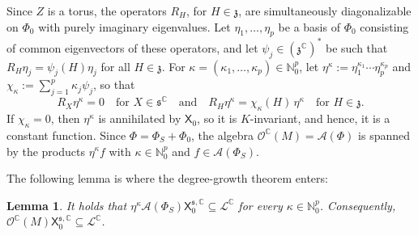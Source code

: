 \documentclass{article}
\newcommand{\N}{\mathbb{N}}
\newcommand{\C}{\mathbb{C}}
\newcommand{\fraks}{\mathfrak{s}}
\newcommand{\frakz}{\mathfrak{z}}
\newcommand{\sX}{\mathsf{X}}
\newcommand{\Ocal}{\mathcal{O}}
\newcommand{\cL}{\mathcal{L}}
\newtheorem{lemma}{Lemma}
\theoremstyle{definition}
\theoremstyle{plain}
\begin{document}
Since $Z$ is a torus, the operators $R_H$, for $H\in\frakz$, are simultaneously diagonalizable on $\Phi_0$ with purely imaginary eigenvalues.
Let $\eta_1,\ldots,\eta_p$ be a basis of $\Phi_0$ consisting of common eigenvectors of these operators, and let $\psi_j\in(\frakz^\C)^*$ be such that $R_H\eta_j=\psi_j(H)\eta_j$ for all $H\in\frakz$.
For $\kappa=(\kappa_1,\ldots,\kappa_p)\in\N_0^p$, let $\eta^\kappa:=\eta_1^{\kappa_1}\cdots\eta_p^{\kappa_p}$ and $\chi_\kappa:=\sum_{j=1}^p\kappa_j\psi_j$, so that
\begin{equation}\label{eq:eta-weights}
R_X\eta^\kappa=0\quad\mbox{for }X\in\fraks^\C
\quad\mbox{and}\quad
R_H\eta^\kappa=\chi_\kappa(H)\,\eta^\kappa\quad\mbox{for }H\in\frakz.
\end{equation}
If $\chi_\kappa=0$, then $\eta^\kappa$ is annihilated by $\sX_0$, so it is $K$-invariant, and hence, it is a constant function.
Since $\Phi=\Phi_S+\Phi_0$, the algebra $\Ocal^\C(M)=\mathcal A(\Phi)$ is spanned by the products $\eta^\kappa f$ with $\kappa\in\N_0^p$ and $f\in\mathcal A(\Phi_S)$.

The following lemma is where the degree-growth theorem enters:

\begin{lemma}\label{lem:semisimple-part}
It holds that $\eta^\kappa\mathcal A(\Phi_S)\sX_0^{\fraks,\C}\subseteq\cL^\C$ for every $\kappa\in\N_0^p$. Consequently, $\Ocal^\C(M)\sX_0^{\fraks,\C}\subseteq\cL^\C$.
\end{lemma}
\end{document}
